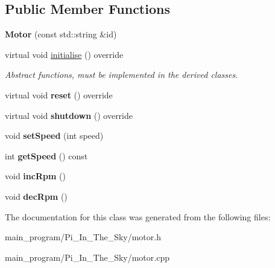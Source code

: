 \subsection*{Public Member Functions}
\begin{DoxyCompactItemize}
\item 
{\bfseries Motor} (const std\+::string \&id)\hypertarget{class_motor_aade6af850e0177846336ddd136b1f2c9}{}\label{class_motor_aade6af850e0177846336ddd136b1f2c9}

\item 
virtual void \hyperlink{class_motor_a7b47a09309764fdaeb8d6e6b2cac5c07}{initialise} () override\hypertarget{class_motor_a7b47a09309764fdaeb8d6e6b2cac5c07}{}\label{class_motor_a7b47a09309764fdaeb8d6e6b2cac5c07}

\begin{DoxyCompactList}\small\item\em Abstract functions, must be implemented in the derived classes. \end{DoxyCompactList}\item 
virtual void {\bfseries reset} () override\hypertarget{class_motor_a0d0d43531b4b8b9d37fb8f936dd0f53c}{}\label{class_motor_a0d0d43531b4b8b9d37fb8f936dd0f53c}

\item 
virtual void {\bfseries shutdown} () override\hypertarget{class_motor_a8ef8df58afeba551f02b8e4afbd23c50}{}\label{class_motor_a8ef8df58afeba551f02b8e4afbd23c50}

\item 
void {\bfseries set\+Speed} (int speed)\hypertarget{class_motor_aa58cbc26a0da87389dd208367d0fa407}{}\label{class_motor_aa58cbc26a0da87389dd208367d0fa407}

\item 
int {\bfseries get\+Speed} () const \hypertarget{class_motor_adb1bb79029d707698d255fb3ce0e06f3}{}\label{class_motor_adb1bb79029d707698d255fb3ce0e06f3}

\item 
void {\bfseries inc\+Rpm} ()\hypertarget{class_motor_a93a4de89dd6f493c165137a78e3d97b4}{}\label{class_motor_a93a4de89dd6f493c165137a78e3d97b4}

\item 
void {\bfseries dec\+Rpm} ()\hypertarget{class_motor_ac271f30175d294a9d27d50193840d61e}{}\label{class_motor_ac271f30175d294a9d27d50193840d61e}

\end{DoxyCompactItemize}


The documentation for this class was generated from the following files\+:\begin{DoxyCompactItemize}
\item 
main\+\_\+program/\+Pi\+\_\+\+In\+\_\+\+The\+\_\+\+Sky/motor.\+h\item 
main\+\_\+program/\+Pi\+\_\+\+In\+\_\+\+The\+\_\+\+Sky/motor.\+cpp\end{DoxyCompactItemize}
